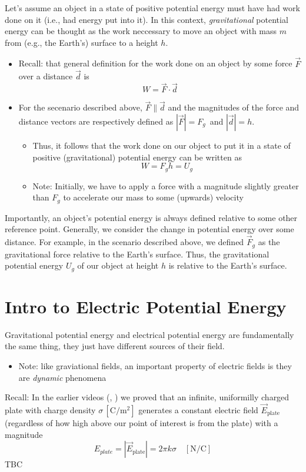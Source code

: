 \documentclass[a4paper]{article}
\begin{document}
Let's assume an object in a state of positive potential energy must have had work done on it (i.e., had energy put into it). In this context, \textit{gravitational} potential energy can be thought as the work neccessary to move an object with mass $m$ from (e.g., the Earth's) surface to a height $h$.
\begin{itemize}
    \item Recall: that general definition for the work done on an object by some force $\vec{F}$ over a distance $\vec{d}$ is \begin{equation}
        W = \vec{F} \cdot \vec{d}
    \end{equation}
    \item For the secenario described above, $\vec{F} \parallel \vec{d}$ and the magnitudes of the force and distance vectors are respectively defined as $|\vec{F}|=F_g \,$ and $|\vec{d}|=h$.
    \begin{itemize}
        \item Thus, it follows that the work done on our object to put it in a state of positive (gravitational) potential energy can be written as \begin{equation} W=F_g h = U_g \end{equation} 
        \item Note: Initially, we have to apply a force with a magnitude slightly greater than $F_g$ to accelerate our mass to some (upwards) velocity
    \end{itemize}
\end{itemize}
Importantly, an object's potential energy is always defined relative to some other reference point. Generally, we consider the change in potential energy over some distance. For example, in the scenario described above, we defined $\vec{F}_g$ as the gravitational force relative to the Earth's surface. Thus, the gravitational potential energy $U_g$ of our object at height $h$ is relative to the Earth's surface. 
\section*{Intro to Electric Potential Energy}
Gravitational potential energy and electrical potential energy are fundamentally the same thing, they just have different sources of their field. 
\begin{itemize}
    \item Note: like graviational fields, an important property of electric fields is they are \textit{dynamic} phenomena
\end{itemize}

Recall: In the earlier videos (\cite{infinite_plate_1}, \cite{infinite_plate_2}) we proved that an infinite, uniformilly charged plate with charge density $\sigma \, [\mathrm{C/m^2}]$ generates a constant electric field $\vec{E}_{\mathrm{plate}}$ (regardless of how high above our point of interest is from the plate) with a magnitude
    \begin{equation}
        E_{plate} = |\vec{E}_{\mathrm{plate}}| = 2\pi k\sigma \quad  [\mathrm{N/C}]
    \end{equation}
TBC

 
\end{document}
